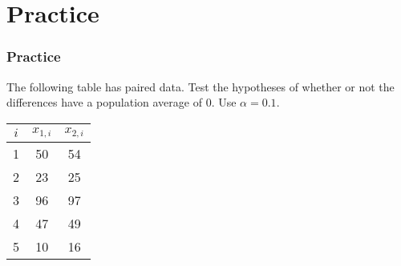 \documentclass[slidestop,compress,mathserif]{beamer}
\begin{document}
\section{Practice}
\begin{frame}
\frametitle{Practice}
The following table has paired data. Test the hypotheses of whether or not the differences have a population average of 0. Use $\alpha=0.1$. 
\begin{center}
\begin{tabular}{|c|c|c|} \hline
$i$    & $x_{1,i}$ & $x_{2,i}$ \\ \hline
1   & 50     & 54  \\  
2   & 23     & 25  \\  
3   & 96     & 97  \\  
4   & 47     & 49  \\  
5   & 10     & 16   \\  \hline
\end{tabular}
\end{center} \pause
\end{frame}
\vfill
\end{document}

